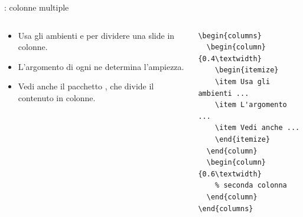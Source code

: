 \documentclass{beamer}
\begin{document}
\begin{frame}[fragile]{\insertsection: colonne multiple}
\begin{columns}
\begin{column}{0.4\textwidth}
\begin{itemize}
\item Usa gli ambienti  e  per dividere una slide
in colonne.
\item L'argomento di ogni  ne determina l'ampiezza.
\item Vedi anche il pacchetto , che divide  il contenuto in colonne.
\end{itemize}
\end{column}
\begin{column}{0.6\textwidth}
\begin{verbatim}
\begin{columns}
  \begin{column}{0.4\textwidth}
    \begin{itemize}
    \item Usa gli ambienti ...
    \item L'argomento ...
    \item Vedi anche ...
    \end{itemize}
  \end{column}
  \begin{column}{0.6\textwidth}
    % seconda colonna
  \end{column}
\end{columns}
\end{verbatim}
\end{column}
\end{columns}
\end{frame}
\end{document}

